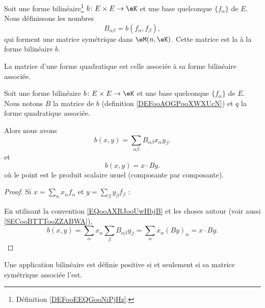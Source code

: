 \begin{definition}      \label{DEFooAOGPooXWXUcN}
    Soit une forme bilinéaire\footnote{Définition \ref{DEFooEEQGooNiPjHz}.} \( b\colon E\times E\to \eK\) et une base quelconque \( \{ f_{\alpha} \}\) de \( E\). Nous définissons les nombres
    \begin{equation}    \label{EQooCUGFooRlKUtu}
        B_{\alpha\beta}=b(f_{\alpha},f_{\beta}),
    \end{equation}
    qui forment une matrice symétrique dans \( \eM(n,\eK)\). Cette matrice est la  à la forme bilinéaire \( b\).

    La matrice d'une forme quadratique est celle associée à sa forme bilinéaire associée.
\end{definition}

\begin{lemma}       \label{LEMooDCIOooTlVZMR}
    Soit une forme bilinéaire \( b\colon E\times E\to \eK\) et une base quelconque \( \{ f_{\alpha} \}\) de \( E\). Nous notons \( B\) la matrice de \( b\) (definition \ref{DEFooAOGPooXWXUcN}) et \( q\) la forme quadratique associée.

    Alors nous avons
\begin{equation}        \label{EQooQFMWooVKVLMx}
    b(x,y)=\sum_{\alpha\beta}B_{\alpha\beta}x_{\alpha}y_{\beta}.
\end{equation}
et
\begin{equation}
    b(x,y)=x\cdot By.
\end{equation}
où le point est le produit scalaire usuel (composante par composante).
\end{lemma}

\begin{proof}
    Si \( x=\sum_{\alpha}x_{\alpha}f_{\alpha}\) et \( y=\sum_{\beta}y_{\beta}f_{\beta}\) :

    En utilisant la convention \eqref{EQooAXRJooUwHbjB} et les choses autour (voir aussi \ref{SECooBTTTooZZABWA}),
    \begin{equation}
        b(x,y)=\sum_{\alpha}x_{\alpha}\sum_{\beta}B_{\alpha\beta}y_{\beta}=\sum_{\alpha}x_{\alpha}(By)_{\alpha}=x\cdot By.
    \end{equation}
\end{proof}

\begin{proposition}     \label{PROPooUAAFooEGVDRC} \label{PROPooNQSXooVMFAtU}
    Une application bilinéaire est définie positive si et seulement si sa matrice symétrique associée l'est.
\end{proposition}

